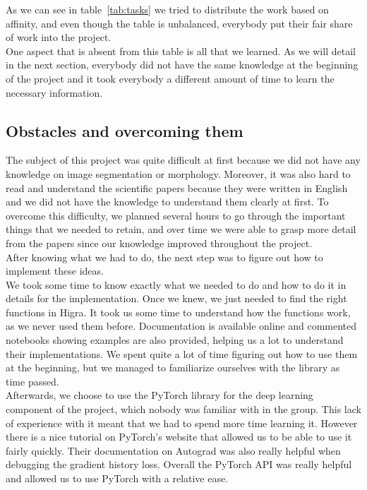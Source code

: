 As we can see in table~\ref{tab:tasks} we tried to distribute the work based on
affinity, and even though the table is unbalanced, everybody put their fair
share of work into the project.\\

One aspect that is absent from this table is all that we learned.
As we will detail in the next section, everybody did not have the same knowledge
at the beginning of the project and it took everybody a different amount of
time to learn the necessary information.\\

\clearpage
\subsection{Obstacles and overcoming them}

The subject of this project was quite difficult at first because we did not have
any knowledge on image segmentation or morphology. Moreover, it was also hard to read and
understand the scientific papers because they were written in English and
we did not have the knowledge to understand them clearly at first. To overcome this difficulty, we planned several
hours to go through the important things that we needed to retain, and over
time we were able to grasp more detail from the papers since our knowledge
improved throughout the project.\\

After knowing what we had to do, the next step was to figure out how to implement
these ideas.\\
We took some time to know exactly what we needed to do and how to do it in details for the implementation.
Once we knew, we just needed to find the right functions in Higra.
It took us some time to understand how the functions work, as we never used them before.
Documentation is available online and commented notebooks showing examples 
are also provided, helping us a lot to understand their implementations. 
We spent quite a lot of time figuring out how to use them at the beginning, 
but we managed to familiarize ourselves with the library as time passed.\\

Afterwards, we choose to use the PyTorch library for the deep learning
component of the project, which nobody was familiar with in the group. 
This lack of experience with it meant that we had to spend more time learning
it. However there is a nice tutorial on PyTorch's website that allowed us to
be able to use it fairly quickly. Their documentation on Autograd was also
really helpful when debugging the gradient history loss. Overall the PyTorch
API was really helpful and allowed us to use PyTorch with a relative ease.\\

